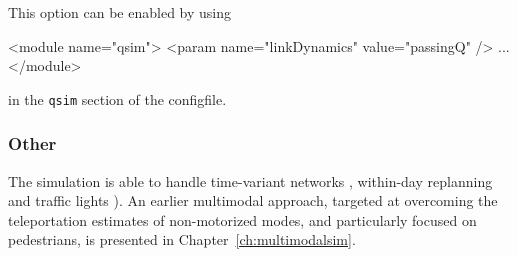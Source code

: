 This option can be enabled by using
\begin{xml}
<module name="qsim">
   <param name="linkDynamics" value="passingQ" />
   ...
</module>
\end{xml}
in the \lstinline{qsim} section of the \gls{configfile}.


\subsubsection{Other}

The simulation is able to handle time-variant networks \citep{LaemmelGretherNagel2009TimeDependentNetworks}, within-day replanning \citep[][see Chapter~\ref{ch:withinday}]{Dobler_TechRep_IVT_2009} and traffic lights \citep[][see Chapter~\ref{ch:signalslanes}]{Neumann2008DA,GretherNeumannNagel2011TrafficLightsMatsim,GretherNeumannNagel2012SignalsQueueModelABMTrans}).
%
%
An earlier \gls{multimodal} approach, targeted at overcoming the \gls{teleportation} estimates of non-motorized modes, and particularly focused on pedestrians, is presented in Chapter~\ref{ch:multimodalsim}.

 

